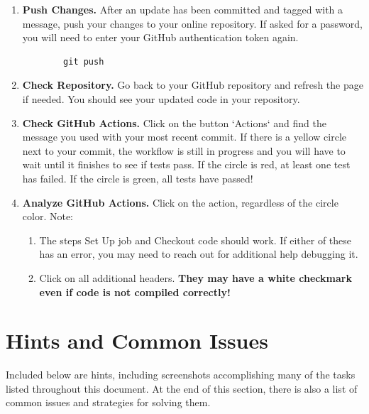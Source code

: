\documentclass{article} %
\begin{document}
\begin{enumerate}
    \item \textbf{Push Changes.}  After an update has been committed and tagged with a message, push your changes to your online repository.  If asked for a password, you will need to enter your GitHub authentication token again.
    \begin{verbatim}
        git push
    \end{verbatim}

    \item \textbf{Check Repository.}  Go back to your GitHub repository and refresh the page if needed.  You should see your updated code in your repository.

    \item \textbf{Check GitHub Actions.}  Click on the button `Actions` and find the message you used with your most recent commit.  If there is a yellow circle next to your commit, the workflow is still in progress and you will have to wait until it finishes to see if tests pass.  If the circle is red, at least one test has failed.  If the circle is green, all tests have passed!

    \item \textbf{Analyze GitHub Actions.}  Click on the action, regardless of the circle color.  Note:
    \begin{enumerate}
        \item The steps Set Up job and Checkout code should work.  If either of these has an error, you may need to reach out for additional help debugging it.
        \item Click on all additional headers.  \textbf{They may have a white checkmark even if code is not compiled correctly!}
    \end{enumerate}
\end{enumerate}


\section*{Hints and Common Issues}
Included below are hints, including screenshots accomplishing many of the tasks listed throughout this document.  At the end of this section, there is also a list of common issues and strategies for solving them.
\end{document}
